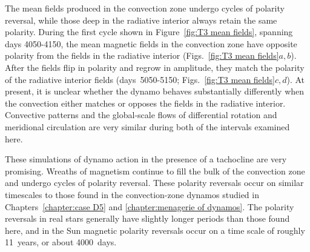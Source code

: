 The mean fields produced in the convection zone undergo cycles of
polarity reversal, while those deep in the radiative interior always
retain the same polarity. During the first cycle shown in
Figure~\ref{fig:T3 mean fields}, spanning days 4050-4150, the
mean magnetic fields in the convection zone have opposite polarity
from the fields in the radiative interior (Figs.~\ref{fig:T3 mean fields}$a,b$).  
After the fields flip in polarity and regrow in amplitude, they match
the polarity of the radiative interior fields (days~5050-5150;
Figs.~\ref{fig:T3 mean fields}$c,d$).   At present, it is unclear
whether the dynamo behaves substantially differently when the
convection either matches or opposes the fields in the radiative
interior.  Convective patterns and the global-scale flows of
differential rotation and meridional circulation are very similar
during both of the intervals examined here.


These simulations of dynamo action in the presence of a tachocline are
very promising.  Wreaths of magnetism continue to fill the bulk of the
convection zone and undergo cycles of polarity reversal.  These
polarity reversals occur on similar timescales to those found in the
convection-zone dynamos studied in Chapters~\ref{chapter:case D5} and
\ref{chapter:menagerie of dynamos}.  The polarity reversals in real
stars generally have slightly longer periods than those found here,
and in the Sun magnetic polarity reversals occur on a time scale of
roughly 11~years, or about 4000~days.  



